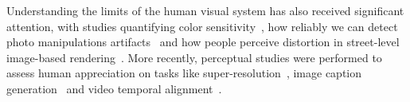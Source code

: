 Understanding the limits of the human visual system has also received significant attention, with studies quantifying color sensitivity~\cite{fairchild2013color}, how reliably we can detect photo manipulations artifacts~\cite{Farid2010} and how people perceive distortion in street-level image-based rendering~\cite{Vangorp2013}. More recently, perceptual studies were performed to assess human appreciation on tasks like super-resolution~\cite{ledig-cvpr-17}, image caption generation~\cite{vinyals-cvpr-15} and video temporal alignment~\cite{papazoglou-accv-16}. 

